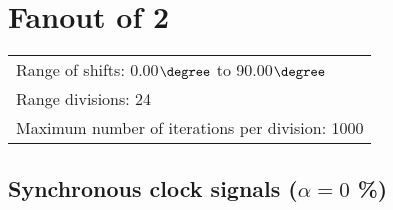 \section{Fanout of 2}
\flushleft
\begin{tabular}[l]{l}

  Range of shifts: 0.00$\degree$ to 90.00$\degree$ \\
  Range divisions: 24\\
  Maximum number of iterations per division: 1000\\

\end{tabular}

\subsection{Synchronous clock signals ($\alpha=0$ \%)}

